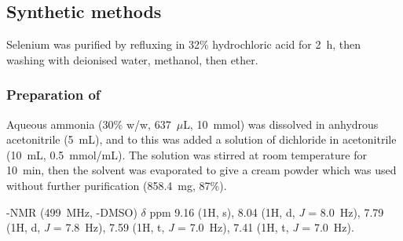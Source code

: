 \begin{refsection}

\subsection{Synthetic methods}

Selenium was purified by refluxing in 32\% hydrochloric acid for 2~h, then washing with deionised water, methanol, then ether.

\subsubsection{Preparation of }
Aqueous ammonia (30\% w/w, 637~$\mu$L, 10~mmol) was dissolved in anhydrous acetonitrile (5~mL), and to this was added a solution of dichloride  in acetonitrile (10~mL, 0.5~mmol/mL).
The solution was stirred at room temperature for 10~min, then the solvent was evaporated to give a cream powder which was used without further purification (858.4~mg, 87\%).\autocite{Weber1976}

-NMR (499~MHz, -DMSO) $\delta$ ppm 9.16 (1H, s), 8.04 (1H, d, \textit{J} = 8.0~Hz), 7.79 (1H, d, \textit{J} = 7.8~Hz), 7.59 (1H, t, \textit{J} = 7.0~Hz), 7.41 (1H, t, \textit{J} = 7.0~Hz).


\end{refsection}
